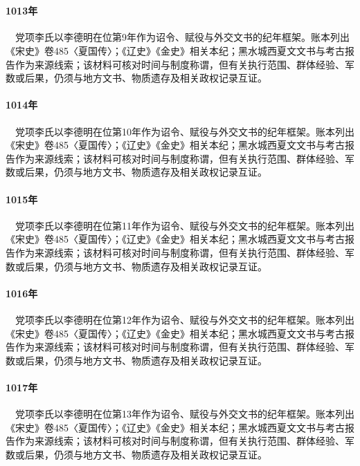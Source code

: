 \section{}

\paragraph{1013年}　党项李氏以李德明在位第9年作为诏令、赋役与外交文书的纪年框架。账本列出《宋史》卷485〈夏国传〉；《辽史》《金史》相关本纪；黑水城西夏文文书与考古报告作为来源线索；该材料可核对时间与制度称谓，但有关执行范围、群体经验、军数或后果，仍须与地方文书、物质遗存及相关政权记录互证。

\paragraph{1014年}　党项李氏以李德明在位第10年作为诏令、赋役与外交文书的纪年框架。账本列出《宋史》卷485〈夏国传〉；《辽史》《金史》相关本纪；黑水城西夏文文书与考古报告作为来源线索；该材料可核对时间与制度称谓，但有关执行范围、群体经验、军数或后果，仍须与地方文书、物质遗存及相关政权记录互证。

\paragraph{1015年}　党项李氏以李德明在位第11年作为诏令、赋役与外交文书的纪年框架。账本列出《宋史》卷485〈夏国传〉；《辽史》《金史》相关本纪；黑水城西夏文文书与考古报告作为来源线索；该材料可核对时间与制度称谓，但有关执行范围、群体经验、军数或后果，仍须与地方文书、物质遗存及相关政权记录互证。

\paragraph{1016年}　党项李氏以李德明在位第12年作为诏令、赋役与外交文书的纪年框架。账本列出《宋史》卷485〈夏国传〉；《辽史》《金史》相关本纪；黑水城西夏文文书与考古报告作为来源线索；该材料可核对时间与制度称谓，但有关执行范围、群体经验、军数或后果，仍须与地方文书、物质遗存及相关政权记录互证。

\paragraph{1017年}　党项李氏以李德明在位第13年作为诏令、赋役与外交文书的纪年框架。账本列出《宋史》卷485〈夏国传〉；《辽史》《金史》相关本纪；黑水城西夏文文书与考古报告作为来源线索；该材料可核对时间与制度称谓，但有关执行范围、群体经验、军数或后果，仍须与地方文书、物质遗存及相关政权记录互证。

